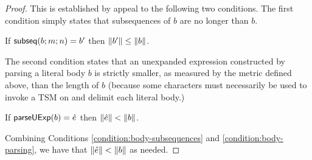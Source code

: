 \begin{proof}
This is established by appeal to the following two conditions. The first condition simply states that subsequences of $b$ are no longer than $b$.
\begin{condition}\label{condition:body-subsequences} If $\mathsf{subseq}(b; m; n)=b'$ then $\Vert b' \Vert \leq \Vert b \Vert$. \end{condition}
The second condition states that an unexpanded expression constructed by parsing a literal body $b$ is strictly smaller, as measured by the metric defined above, than the length of $b$ (because some characters must necessarily be used to invoke a TSM on and delimit each literal body.)
\begin{condition}\label{condition:body-parsing} If $\mathsf{parseUExp}(b)=\hat{e}$ then $\Vert \hat{e} \Vert < \Vert b \Vert$.\end{condition}

Combining Conditions \ref{condition:body-subsequences} and \ref{condition:body-parsing}, we have that $\Vert \hat{e} \Vert < \Vert b \Vert$ as needed.

\end{proof}

